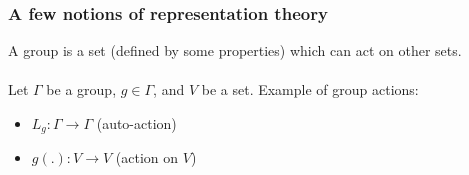\documentclass[t,9pt,pdftex]{beamer}
\theoremstyle{definition}
\newcommand{\h}[1]{\hspace{#1pt}}
\begin{document}
\begin{frame}[c, label=current]
  \frametitle{A few notions of representation theory}
  A group is a set (defined by some properties) which can act on other sets.\\
  \h{0}\\
  Let $\Gamma$ be a group, $g \in \Gamma$, and $V$ be a set. Example of group actions:
  \begin{itemize}
    \item $L_g: \Gamma \to \Gamma$ (auto-action)
    \item $g(.): V \to V$ (action on $V$)
  \end{itemize}

  \begin{figure}
  \end{figure}
  


\end{frame}
\end{document}
